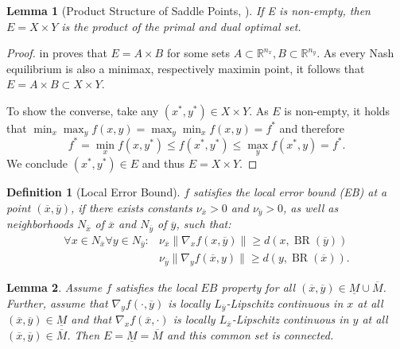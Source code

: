 \documentclass{article}
\newtheorem{lemma}{Lemma}
\newtheorem{definition}{Definition}[section]
\newcommand{\R}{\mathbb{R}}
\DeclareMathOperator{\BR}{BR}
\begin{document}
\begin{lemma}[Product Structure of Saddle Points, \citep{Bertsekas2014Convex,Rockafellar1970Convex}]
    \label{prop:eqproduct}
    If E is non-empty, then $E=X\times Y$ is the product of the primal and dual optimal set.
\end{lemma}

\begin{proof}
     in  proves that $E=A\times B$ for some sets $A\subset \R^{n_x}, B\subset \R^{n_y}$. As every Nash equilibrium is also a minimax, respectively maximin point, it follows that $E= A\times B \subset X \times Y$.
    
    To show the converse, take any $(x^*,y^*) \in X \times Y$. As $E$ is non-empty, it holds that $\min_x \max_y f(x,y)=\max_y \min_x f(x,y)=f^*$ and therefore
    \[
    f^*=\min_x f(x,y^*)\leq f(x^*,y^*)\leq \max_y f(x^*,y)=f^*.
    \]
    We conclude $(x^*,y^*) \in E$ and thus $E= X\times Y$.
\end{proof}

\begin{definition}[Local Error Bound]
$f$ satisfies the local error bound (EB) at a point $(\overline{x},\overline{y})$, if there exists constants $\nu_{\overline{x}}>0$ and $\nu_{\overline{y}}>0$, as well as neighborhoods $N_{\overline{x}}$ of $\overline{x}$ and $N_{\overline{y}}$ of $\overline{y}$, such that:
    \begin{align*}
        \forall x \in N_{\overline{x}} \forall y \in N_{\overline{y}}: &\nu_{\overline{x}} \|\nabla_x f(x,\overline{y})\| \geq d(x,\BR(\overline{y}))\\
        &\nu_{\overline{y}}\|\nabla_y f(\overline{x},y)\| \geq  d(y,\BR(\overline{x})).
    \end{align*}
\end{definition}


\begin{lemma}
    \label{prop:EB}
    Assume $f$ satisfies the local $EB$ property for all $(\overline{x},\overline{y})\in \underline{M} \cup \overline{M}$. Further, assume that $\nabla_y f(\cdot,\overline{y})$ is locally $L_{\overline{y}}$-Lipschitz continuous in $x$ at all $(\overline{x},\overline{y})\in \underline{M}$ and that $\nabla_x f(\overline{x},\cdot)$ is locally $L_{\overline{x}}$-Lipschitz continuous in $y$ at all $(\overline{x},\overline{y})\in \overline{M}$. Then $E=\underline{M}=\overline{M}$ and this common set is connected.
\end{lemma}
\end{document}

